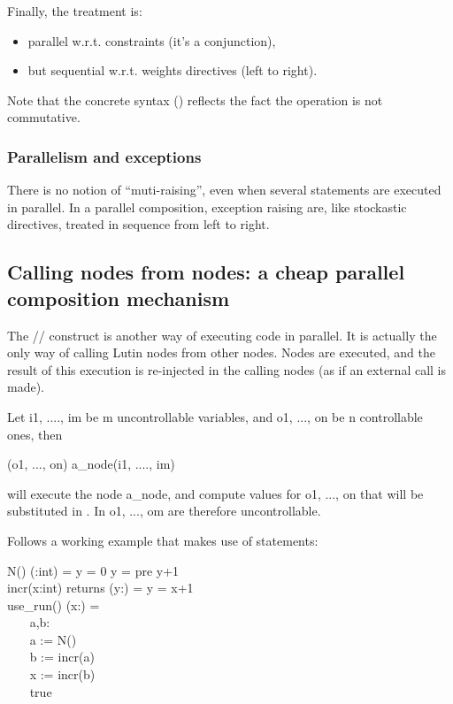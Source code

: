 Finally, the treatment is:
\begin{itemize}
\item parallel w.r.t. constraints (it's a conjunction),
\item but sequential w.r.t.  weights directives (left to right).
\end{itemize}

Note that the concrete syntax (\ES) reflects the fact the operation
is not commutative.


\subsubsection{Parallelism and exceptions}
There is no notion  of ``muti-raising'', even when several statements
are  executed  in parallel.   In  a  parallel composition,  exception
raising  are, like  stockastic directives,  treated in  sequence from
left to right.


\subsection{Calling nodes from nodes: a cheap parallel composition mechanism}

The /\key{:=}/ construct is another way of executing
code in parallel.  It is actually the only way of calling Lutin nodes
from other nodes.  Nodes are executed, and the result of this
execution is re-injected in the calling nodes (as if an external call
is made).

Let i1, ...., im be m uncontrollable variables, and 
o1, ..., on be n controllable ones, then

 (o1, ..., on) \key{:=} a\_node(i1, ...., im)  

will execute the node a\_node, and compute values for o1, ..., on that
will be substituted in . In  o1, ..., om are therefore
uncontrollable.



Follows a working example that makes use of  statements:


\begin{example}
\begin{program}
 N()  (:int) = y = 0   y = pre y+1 \\
 incr(x:int) returns (y:) =   y = x+1  \\
 use\_run() (x:) = \\
~~~   a,b: \\
~~~   a := N()  \\
~~~   b := incr(a)  \\
~~~   x := incr(b)  \\
~~~     true
\end{program}
\end{example}

